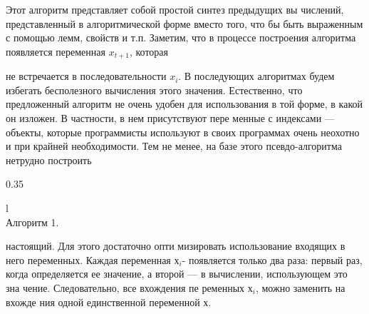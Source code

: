 Этот алгоритм представляет собой простой синтез предыдущих вы­
числений, представленный в алгоритмической форме вместо того, что­
бы быть выраженным с помощью лемм, свойств и т.п. Заметим, что в процессе построения\: алгоритма\: появляется\: переменная $x_{t+1}$, которая
\pagebreak

\noindent 
не встречается в последовательности $x_{i}$. В последующих алгоритмах
будем избегать бесполезного вычисления этого значения. Естественно,
что предложенный алгоритм не очень удобен для использования в той
форме, в какой он изложен. В частности, в нем присутствуют пере­
менные с индексами — объекты, которые программисты используют в
своих программах очень неохотно и при крайней необходимости.
Тем не менее, на базе этого псевдо-алгоритма нетрудно построить

\begin{wraptable}{}{0.35\textwidth}
\vspace{-10pt}
\begin{tabular}{l}
\hline
{} \\ \hline
\hspace{20pt} Алгоритм 1.                                                                                                                                                                                                        
\end{tabular}
\vspace{-12pt}
\end{wraptable}
\noindent настоящий. Для этого достаточно опти­
мизировать использование входящих в
него переменных. Каждая переменная \textit{$х_{i}$}-
появляется только два раза: первый раз,
когда определяется ее значение, а второй
— в вычислении, использующем это зна­
чение. Следовательно, все вхождения пе­
ременных \textit{$х_{i}$}, можно заменить на вхожде­
ния одной единственной переменной \textit{$х$}.

